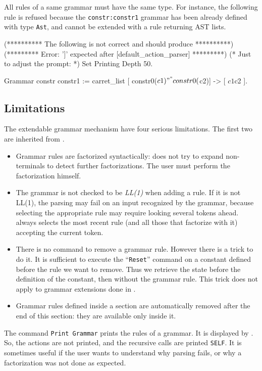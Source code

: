 {All rules of a same grammar must have the same type. For instance, the
following rule is refused because the \verb+constr:constr1+ grammar
has been already defined with type {\tt Ast}, and cannot be extended
with a rule returning AST lists.

\begin{coq_eval}
(********** The following is not correct and should produce **********)
(********* Error: ']' expected after [default_action_parser] *********)
(* Just to adjust the prompt: *) Set Printing Depth 50.
\end{coq_eval}
\begin{coq_example}           
Grammar constr constr1 :=
  carret_list [ constr0($c1) "^" constr0($c2)] -> [ $c1 $c2 ].
\end{coq_example}


\subsection{Limitations}

The extendable grammar mechanism have four serious limitations. The
first two are inherited from {\camlpppp}.
\begin{itemize}
\item Grammar rules are factorized syntactically: {\camlpppp} does not
  try to expand non-terminals to detect further factorizations. The
  user must perform the factorization himself.
\item The grammar is not checked to be \emph{LL(1)} when
  adding a rule.  If it is not LL(1), the parsing may fail on an input
  recognized by the grammar, because selecting the appropriate rule
  may require looking several tokens ahead. {\camlpppp} always selects
  the most recent rule (and all those that factorize with it)
  accepting the current token.
\item There is no command to remove a grammar rule. However there is a
  trick to do it. It is sufficient to execute the ``{\tt Reset}''
  command on a constant defined before the rule we want to remove.
  Thus we retrieve the state before the definition of the constant,
  then without the grammar rule. This trick does not apply to grammar
  extensions done in {\ocaml}.
\item Grammar rules defined inside a section are automatically removed
  after the end of this section: they are available only inside it.
\end{itemize}

The command {\tt Print Grammar} prints the rules of a grammar. It is
displayed by {\camlpppp}. So, the actions are not printed, and the
recursive calls are printed \verb+SELF+. It is
sometimes useful if the user wants to understand why parsing fails, or
why a factorization was not done as expected.

}

